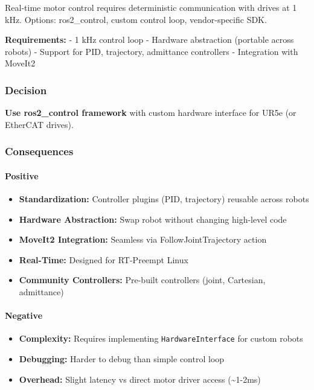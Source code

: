 \documentclass[
]{article}
\providecommand{\tightlist}{%
  \setlength{\itemsep}{0pt}\setlength{\parskip}{0pt}}
\begin{document}
Real-time motor control requires deterministic communication with drives
at 1 kHz. Options: ros2\_control, custom control loop, vendor-specific
SDK.

\textbf{Requirements:} - 1 kHz control loop - Hardware abstraction
(portable across robots) - Support for PID, trajectory, admittance
controllers - Integration with MoveIt2

\hypertarget{decision-4}{%
\subsubsection{Decision}\label{decision-4}}

\textbf{Use ros2\_control framework} with custom hardware interface for
UR5e (or EtherCAT drives).

\hypertarget{consequences-4}{%
\subsubsection{Consequences}\label{consequences-4}}

\hypertarget{positive-4}{%
\paragraph{Positive}\label{positive-4}}

\begin{itemize}
\tightlist
\item
  \textbf{Standardization:} Controller plugins (PID, trajectory)
  reusable across robots
\item
  \textbf{Hardware Abstraction:} Swap robot without changing high-level
  code
\item
  \textbf{MoveIt2 Integration:} Seamless via FollowJointTrajectory
  action
\item
  \textbf{Real-Time:} Designed for RT-Preempt Linux
\item
  \textbf{Community Controllers:} Pre-built controllers (joint,
  Cartesian, admittance)
\end{itemize}

\hypertarget{negative-4}{%
\paragraph{Negative}\label{negative-4}}

\begin{itemize}
\tightlist
\item
  \textbf{Complexity:} Requires implementing \texttt{HardwareInterface}
  for custom robots
\item
  \textbf{Debugging:} Harder to debug than simple control loop
\item
  \textbf{Overhead:} Slight latency vs direct motor driver access
  (\textasciitilde1-2ms)
\end{itemize}
\end{document}

